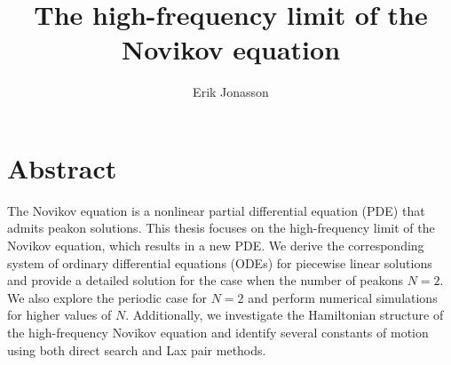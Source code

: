 \documentclass[english,master]{liumaiex}
\theoremstyle{thesisplain}
\theoremstyle{thesisdefinition}
\numberwithin{equation}{section}
\begin{document}
%
%
\title{The high-frequency limit of the Novikov equation}
\author{Erik Jonasson}

\maketitle


%
%
\section*{Abstract}

The Novikov equation is a nonlinear partial differential equation (PDE) that admits peakon solutions. This thesis focuses on the high-frequency limit of the Novikov equation, which results in a new PDE. We derive the corresponding system of ordinary differential equations (ODEs) for piecewise linear solutions and provide a detailed solution for the case when the number of peakons $N = 2$. We also explore the periodic case for $N = 2$ and perform numerical simulations for higher values of $N$. Additionally, we investigate the Hamiltonian structure of the high-frequency Novikov equation and identify several constants of motion using both direct search and Lax pair methods.
\end{document}
